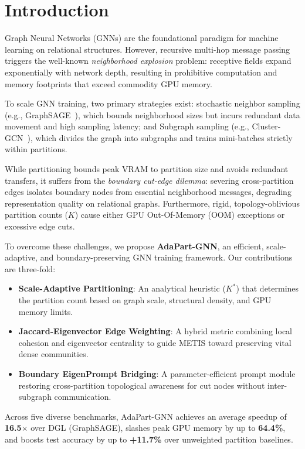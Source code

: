 \section{Introduction}
Graph Neural Networks (GNNs) are the foundational paradigm for machine learning on relational structures. However, recursive multi-hop message passing triggers the well-known \textit{neighborhood explosion} problem: receptive fields expand exponentially with network depth, resulting in prohibitive computation and memory footprints that exceed commodity GPU memory.

To scale GNN training, two primary strategies exist: stochastic neighbor sampling (e.g., GraphSAGE~\cite{graphsage}), which bounds neighborhood sizes but incurs redundant data movement and high sampling latency; and Subgraph sampling (e.g., Cluster-GCN~\cite{cluster_gnn}), which divides the graph into subgraphs and trains mini-batches strictly within partitions.

While partitioning bounds peak VRAM to partition size and avoids redundant transfers, it suffers from the \textit{boundary cut-edge dilemma}: severing cross-partition edges isolates boundary nodes from essential neighborhood messages, degrading representation quality on relational graphs. Furthermore, rigid, topology-oblivious partition counts ($K$) cause either GPU Out-Of-Memory (OOM) exceptions or excessive edge cuts.

To overcome these challenges, we propose \textbf{AdaPart-GNN}, an efficient, scale-adaptive, and boundary-preserving GNN training framework. Our contributions are three-fold:
\begin{itemize}[leftmargin=*,noitemsep,topsep=1pt]
    \item \textbf{Scale-Adaptive Partitioning}: An analytical heuristic ($K^*$) that determines the partition count based on graph scale, structural density, and GPU memory limits.
    \item \textbf{Jaccard-Eigenvector Edge Weighting}: A hybrid metric combining local cohesion and eigenvector centrality to guide METIS toward preserving vital dense communities.
    \item \textbf{Boundary EigenPrompt Bridging}: A parameter-efficient prompt module restoring cross-partition topological awareness for cut nodes without inter-subgraph communication.
\end{itemize}

Across five diverse benchmarks, AdaPart-GNN achieves an average speedup of \textbf{16.5$\times$} over DGL (GraphSAGE), slashes peak GPU memory by up to \textbf{64.4\%}, and boosts test accuracy by up to \textbf{+11.7\%} over unweighted partition baselines.

